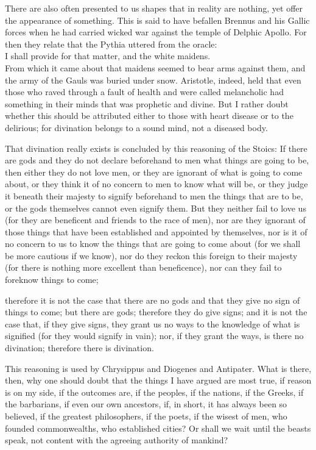  There are also often presented to us shapes that in reality are nothing, yet offer the appearance of something. This is said to have befallen Brennus and his Gallic forces when he had carried wicked war against the temple of Delphic Apollo. For then they relate that the Pythia uttered from the oracle: \\ I shall provide for that matter, and the white maidens. \\ From which it came about that maidens seemed to bear arms against them, and the army of the Gauls was buried under snow. Aristotle, indeed, held that even those who raved through a fault of health and were called melancholic had something in their minds that was prophetic and divine. But I rather doubt whether this should be attributed either to those with heart disease or to the delirious; for divination belongs to a sound mind, not a diseased body.

 That divination really exists is concluded by this reasoning of the Stoics: If there are gods and they do not declare beforehand to men what things are going to be, then either they do not love men, or they are ignorant of what is going to come about, or they think it of no concern to men to know what will be, or they judge it beneath their majesty to signify beforehand to men the things that are to be, or the gods themselves cannot even signify them. But they neither fail to love us (for they are beneficent and friends to the race of men), nor are they ignorant of those things that have been established and appointed by themselves, nor is it of no concern to us to know the things that are going to come about (for we shall be more cautious if we know), nor do they reckon this foreign to their majesty (for there is nothing more excellent than beneficence), nor can they fail to foreknow things to come;

 therefore it is not the case that there are no gods and that they give no sign of things to come; but there are gods; therefore they do give signs; and it is not the case that, if they give signs, they grant us no ways to the knowledge of what is signified (for they would signify in vain); nor, if they grant the ways, is there no divination; therefore there is divination.

 This reasoning is used by Chrysippus and Diogenes and Antipater. What is there, then, why one should doubt that the things I have argued are most true, if reason is on my side, if the outcomes are, if the peoples, if the nations, if the Greeks, if the barbarians, if even our own ancestors, if, in short, it has always been so believed, if the greatest philosophers, if the poets, if the wisest of men, who founded commonwealths, who established cities? Or shall we wait until the beasts speak, not content with the agreeing authority of mankind?


